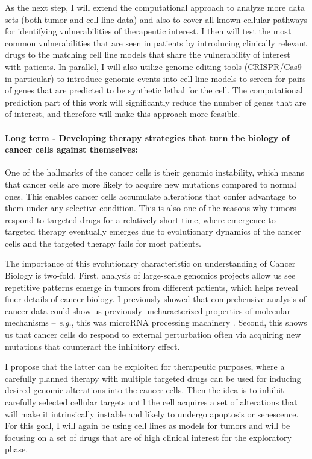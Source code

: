 \documentclass[11pt,letterpaper]{article}
\begin{document}
As the next step, I will extend the computational approach to analyze more data sets (both tumor and cell line data) and also to cover all known cellular pathways for identifying vulnerabilities of therapeutic interest.
I then will test the most common vulnerabilities that are seen in patients by introducing clinically relevant drugs to the matching cell line models that share the vulnerability of interest with patients.
In parallel, I will also utilize genome editing tools (CRISPR/Cas9 in particular)
to introduce genomic events into cell line models to screen for pairs of genes that are predicted to be synthetic lethal for the cell.
The computational prediction part of this work will significantly reduce the number of genes that are of interest,
and therefore will make this approach more feasible.

\paragraph{Long term - Developing therapy strategies that turn the biology of cancer cells against themselves:}
One of the hallmarks of the cancer cells is their genomic instability, 
which means that cancer cells are more likely to acquire new mutations compared to normal ones.
This enables cancer cells accumulate alterations that confer advantage to them under any selective condition.
This is also one of the reasons why tumors respond to targeted drugs for a relatively short time,
where emergence to targeted therapy eventually emerges due to evolutionary dynamics of the cancer cells
and the targeted therapy fails for most patients.

The importance of this evolutionary characteristic on understanding of Cancer Biology is two-fold.
First, analysis of large-scale genomics projects allow us see repetitive patterns emerge in tumors from different patients, which helps reveal finer details of cancer biology.
I previously showed that comprehensive analysis of cancer data could show us previously uncharacterized properties of molecular mechanisms -- \textit{e.g.}, this was microRNA processing machinery \cite{aksoy2014cancer}.
Second, this shows us that cancer cells do respond to external perturbation often via acquiring new mutations that counteract the inhibitory effect.

I propose that the latter can be exploited for therapeutic purposes,
where a carefully planned therapy with multiple targeted drugs can be used for inducing desired genomic alterations into the cancer cells.
Then the idea is to inhibit carefully selected cellular targets until the cell acquires a set of alterations that will make it intrinsically instable and likely to undergo apoptosis or senescence.
For this goal, I will again be using cell lines as models for tumors
and will be focusing on a set of drugs that are of high clinical interest for the exploratory phase.

\clearpage

\footnotesize{
{}
}
\end{document}
